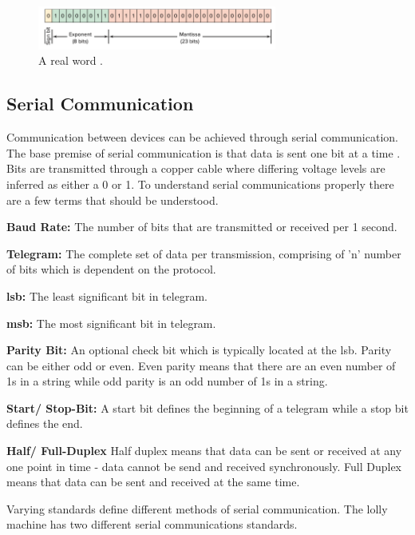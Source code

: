         \begin{figure}[H]
            \centering
            \includegraphics[width = 0.7\textwidth]{2_images/real.png}
            \caption{A \acrfull{real} word \cite{petruzella2017programmable}.}
            \label{fig:real}
        \end{figure}  
\newpage
\subsection{Serial Communication}
    Communication between devices can be achieved through serial communication. The base premise of serial communication is that data is sent one bit at a time \cite{frenzel2015handbook}. Bits are transmitted through a copper cable where differing voltage levels are inferred as either a 0 or 1\cite{frenzel2015handbook}. To understand serial communications properly there are a few terms that should be understood.
    \begin{description}
        \item\textbf{Baud Rate:} The number of bits that are transmitted or received per 1 second.
        \item\textbf{Telegram:} The complete set of data per transmission, comprising of 'n' number of bits which is dependent on the protocol.
        \item\textbf{\acrshort{lsb}:} The least significant bit in telegram.
        \item\textbf{\acrshort{msb}:} The most significant bit in telegram.
        \item\textbf{Parity Bit:} An optional check bit which is typically located at the \acrshort{lsb}. Parity can be either odd or even. Even parity means that there are an even number of 1s in a string while odd parity is an odd number of 1s in a string.
        \item\textbf{Start/ Stop-Bit:} A start bit defines the beginning of a telegram while a stop bit defines the end.
        \item\textbf{Half/ Full-Duplex} Half duplex means that data can be sent or received at any one point in time - data cannot be send and received synchronously. Full Duplex means that data can be sent and received at the same time.
    \end{description}
    Varying standards define different methods of serial communication. The lolly machine has two different serial communications standards. 
    
